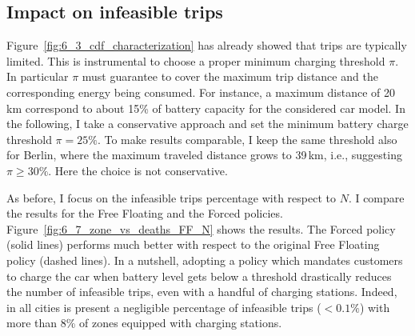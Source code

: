 \subsection{Impact on infeasible trips}

Figure~\ref{fig:6_3_cdf_characterization} has already showed that trips are typically limited. This is instrumental to choose a proper minimum charging threshold $\pi$. In particular $\pi$ must guarantee to cover the maximum trip distance and the corresponding energy being consumed. For instance, a maximum distance of 20\,km correspond to about 15\% of battery capacity for the considered car model. In the following, I take a conservative approach and set the minimum battery charge threshold $\pi=25\%$. To make results comparable, I keep the same threshold also for Berlin, where the maximum traveled distance grows to 39\,km, i.e., suggesting $\pi\geq 30\%$. Here the choice is not conservative.

As before, I focus on the infeasible trips percentage with respect to $N$. I compare the results for the Free Floating and the Forced policies. 
Figure~\ref{fig:6_7_zone_vs_deaths_FF_N} shows the results. The Forced policy (solid lines) performs much better with respect to the original Free Floating policy (dashed lines). In a nutshell, adopting a policy which mandates customers to charge the car when battery level gets below a threshold drastically reduces the number of infeasible trips, even with a handful of  charging stations. Indeed, in all cities is present a negligible percentage of infeasible trips ($< 0.1 \%$) with more than 8\% of zones equipped with charging stations.

